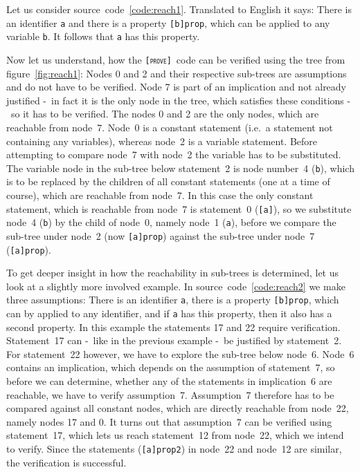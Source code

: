 \documentclass[british]{article}
\newcommand\prv{bc}
\newcommand\m[1]{\texttt{#1}}
\newcommand\name{\texttt{\textsc{[prove]}}}
\begin{document}
Let us consider source~code~\ref{code:reach1}. Translated to English it says:
There is an identifier \m{a} and there is a property \m{[b]prop}, which can be
applied to any variable \m{b}. It follows that \m{a} has this property.
\newline

Now let us understand, how the \name\ code can be verified using the tree from
figure~\ref{fig:reach1}: Nodes 0 and 2 and their respective sub-trees are
assumptions and do not have to be verified. Node 7 is part of an implication
and not already justified -\ in fact it is the only node in the tree, which
satisfies these conditions -\ so it has to be verified. The nodes 0 and 2 are
the only nodes, which are reachable from node~7. Node~0 is a constant statement
(i.e.\ a statement not containing any variables), whereas node~2 is a variable
statement. Before attempting to compare node~7 with node~2 the variable has to
be substituted. The variable node in the sub-tree below statement~2 is node
number~4 (\m{b}), which is to be replaced by the children of all constant
statements (one at a time of course), which are reachable from node~7. In this
case the only constant statement, which is reachable from node~7 is statement~0
(\m{[a]}), so we substitute node~4 (\m{b}) by the child of node~0, namely node~1
(\m{a}), before we compare the sub-tree under node~2 (now \m{[a]prop}) against
the sub-tree under node~7 (\m{[a]prop}).
\newline

To get deeper insight in how the reachability in sub-trees is determined, let us
look at a slightly more involved example. In source~code~\ref{code:reach2} we
make three assumptions: There is an identifier \m{a}, there is a property
\m{[b]prop}, which can by applied to any identifier, and if \m{a} has this
property, then it also has a second property. In this example the statements 17
and 22 require verification. Statement~17 can -\ like in the previous example -\
be justified by statement~2. For statement~22 however, we have to explore the
sub-tree below node~6. Node~6 contains an implication, which depends on the
assumption of statement~7, so before we can determine, whether any of the
statements in implication~6 are reachable, we have to verify assumption~7.
Assumption~7 therefore has to be compared against all constant nodes, which are
directly reachable from node~22, namely nodes 17 and 0. It turns out that
assumption~7 can be verified using statement~17, which lets us reach
statement~12 from node~22, which we intend to verify. Since the statements
(\m{[a]prop2}) in node~22 and node~12 are similar, the verification is
successful.
\end{document}
